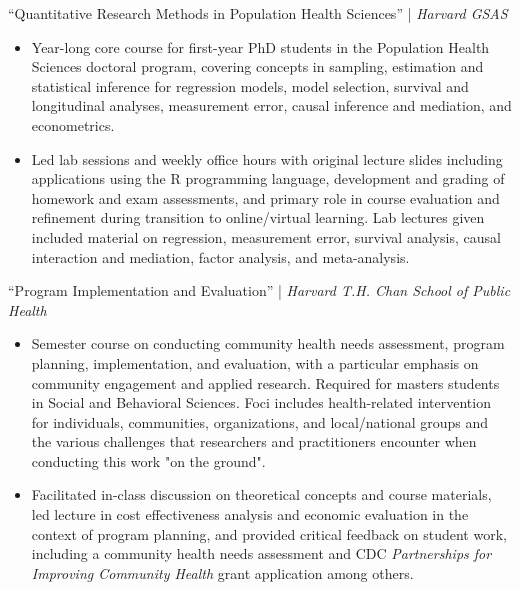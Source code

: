 \documentclass{cv_style}
\begin{document}
``Quantitative Research Methods in Population Health Sciences'' | \textit{Harvard GSAS}
\begin{itemize}
  \vspace{0em} \item Year-long core course for first-year PhD students in the Population Health Sciences doctoral program, covering concepts in sampling, estimation and statistical inference for regression models, model selection, survival and longitudinal analyses, measurement error, causal inference and mediation, and econometrics. 
  \item \parskip 1pt Led lab sessions and weekly office hours with original lecture slides including applications using the R programming language, development and grading of homework and exam assessments, and primary role in course evaluation and refinement during transition to online/virtual learning. Lab lectures given included material on regression, measurement error, survival analysis, causal interaction and mediation, factor analysis, and meta-analysis.
\end{itemize}

``Program Implementation and Evaluation'' | \textit{Harvard T.H. Chan School of Public Health}
\begin{itemize}
  \vspace{0em} \item Semester course on conducting community health needs assessment, program planning, implementation, and evaluation, with a particular emphasis on community engagement and applied research. Required for masters students in Social and Behavioral Sciences. Foci includes health-related intervention for individuals, communities, organizations, and local/national groups and the various challenges that researchers and practitioners encounter when conducting this work "on the ground". 
  \item \parskip 1pt Facilitated in-class discussion on theoretical concepts and course materials, led lecture in cost effectiveness analysis and economic evaluation in the context of program planning, and provided critical feedback on student work, including a community health needs assessment and CDC \textit{Partnerships for Improving Community Health} grant application among others. 
\end{itemize}
\end{document}
